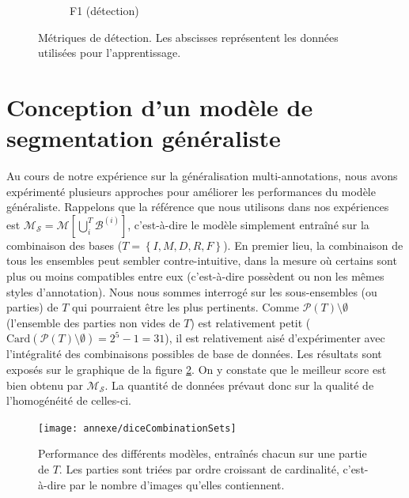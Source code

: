 \begin{figure}[H]
\begin{subfigure}{0.495\textwidth}
		\caption{F1 (détection)}
	\end{subfigure}
	\hfill
	\caption{Métriques de détection. Les abscisses représentent les données utilisées pour l'apprentissage.}
	\label{fig:detectionScore}
\end{figure}

\section{Conception d'un modèle de segmentation généraliste}
\label{sec:extendedResultsOnGeneralization}

Au cours de notre expérience sur la généralisation multi-annotations, nous avons expérimenté plusieurs approches pour améliorer les performances du modèle généraliste. Rappelons que la référence que nous utilisons dans nos expériences est $\mathcal{M}_\mathcal{S}=\mathcal{M}[\bigcup_i^T \mathcal{B}^{(i)}]$, c'est-à-dire le modèle simplement entraîné sur la combinaison des bases ($T=\left\lbrace I, M, D, R, F \right\rbrace $). En premier lieu, la combinaison de tous les ensembles peut sembler contre-intuitive, dans la mesure où certains sont plus ou moins \og compatibles \fg entre eux (c'est-à-dire possèdent ou non les mêmes styles d'annotation). Nous nous sommes interrogé sur les sous-ensembles (ou parties) de $T$ qui pourraient être les plus pertinents. Comme $\mathcal{P}(T)  \setminus \emptyset$ (l'ensemble des parties non vides de $T$) est relativement petit ($\text{Card}(\mathcal{P}(T) \setminus \emptyset)  =2^{5}-1 = 31$), il est relativement aisé d'expérimenter avec l'intégralité des combinaisons possibles de base de données. Les résultats sont exposés sur le graphique de la figure \ref{fig:combinaisonPartiesBasesDeDonnees}. On y constate que le meilleur score est bien obtenu par $\mathcal{M}_\mathcal{S}$. La quantité de données prévaut donc sur la qualité de l'homogénéité de celles-ci.
\begin{figure}
	\centering
	\texttt{[image: annexe/diceCombinationSets]}
	\caption{Performance des différents modèles, entraînés chacun sur une partie de $T$. Les parties sont triées par ordre croissant de cardinalité, c'est-à-dire par le nombre d'images qu'elles contiennent.}
	\label{fig:combinaisonPartiesBasesDeDonnees}
\end{figure}

